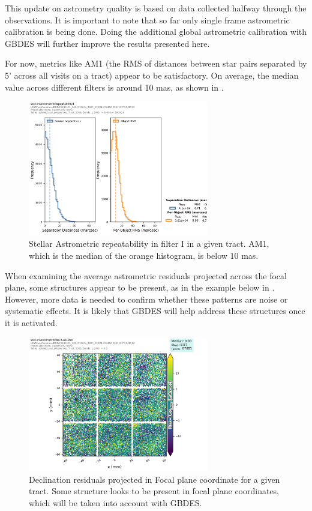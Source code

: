 This update on astrometry quality is based on data collected halfway through the \ComCam observations. It is important to note that so far only single frame astrometric calibration is being done. Doing the additional global astrometric calibration with GBDES will further improve the results presented here.


For now, metrics like AM1 (the RMS of distances between star pairs separated by 5’ across all visits on a tract) appear to be satisfactory. On average, the median value across different filters is around 10 mas, as shown in .

\begin{figure}
        \centering
        \includegraphics[width=0.7\textwidth]{figures/11d0c9f8-45f6-4bf2-871a-56e00e62060c}
        \caption{\small Stellar Astrometric repeatability in filter I in a given tract. AM1, which is the median of the orange histogram,  is below 10 mas.}
        \label{fig:AM1_plot}
\end{figure}

When examining the average astrometric residuals projected across the focal plane, some structures appear to be present, as in the example below in . However, more data is needed to confirm whether these patterns are noise or systematic effects. It is likely that GBDES will help address these structures once it is activated.

\begin{figure}
        \centering
        \includegraphics[width=0.7\textwidth]{figures/e3aea76f-3ed1-4686-9a24-00abf0ff9515}
        \caption{Declination residuals projected in Focal plane coordinate for a given tract. Some structure looks to be present in focal plane coordinates, which will be taken into account with GBDES. }
        \label{fig:fov_astrometry_plot}
\end{figure}
